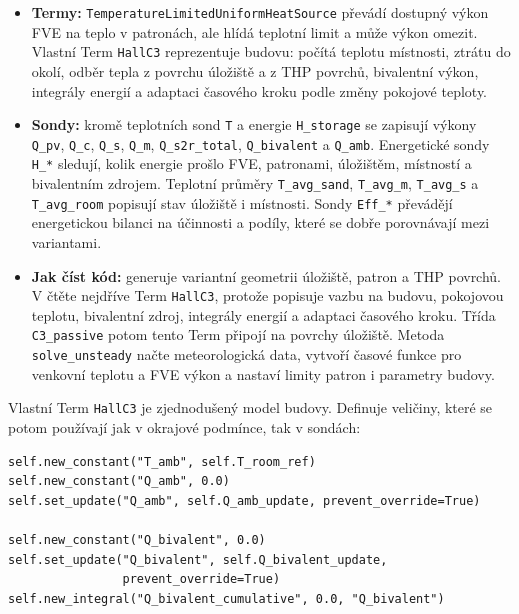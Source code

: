 \documentclass[a4paper,11pt]{article}
\begin{document}
\begin{itemize}
  \item \textbf{Termy:} \texttt{TemperatureLimitedUniformHeatSource} převádí
        dostupný výkon FVE na teplo v patronách, ale hlídá teplotní limit a
        může výkon omezit. Vlastní Term \texttt{HallC3} reprezentuje budovu:
        počítá teplotu místnosti, ztrátu do okolí, odběr tepla z povrchu
        úložiště a z THP povrchů, bivalentní výkon, integrály energií a adaptaci
        časového kroku podle změny pokojové teploty.
  \item \textbf{Sondy:} kromě teplotních sond \texttt{T} a energie
        \texttt{H\_storage} se zapisují výkony \texttt{Q\_pv}, \texttt{Q\_c},
        \texttt{Q\_s}, \texttt{Q\_m}, \texttt{Q\_s2r\_total},
        \texttt{Q\_bivalent} a \texttt{Q\_amb}. Energetické sondy
        \texttt{H\_*} sledují, kolik energie prošlo FVE, patronami, úložištěm,
        místností a bivalentním zdrojem. Teplotní průměry
        \texttt{T\_avg\_sand}, \texttt{T\_avg\_m}, \texttt{T\_avg\_s} a
        \texttt{T\_avg\_room} popisují stav úložiště i místnosti. Sondy
        \texttt{Eff\_*} převádějí energetickou bilanci na účinnosti a podíly,
        které se dobře porovnávají mezi variantami.
  \item \textbf{Jak číst kód:}  generuje variantní
        geometrii úložiště, patron a THP povrchů. V  čtěte
        nejdříve Term \texttt{HallC3}, protože popisuje vazbu na budovu,
        pokojovou teplotu, bivalentní zdroj, integrály energií a adaptaci
        časového kroku. Třída \texttt{C3\_passive} potom tento Term připojí na
        povrchy úložiště. Metoda \texttt{solve\_unsteady} načte meteorologická
        data, vytvoří časové funkce pro venkovní teplotu a FVE výkon a nastaví
        limity patron i parametry budovy.
\end{itemize}

Vlastní Term \texttt{HallC3} je zjednodušený model budovy. Definuje veličiny,
které se potom používají jak v okrajové podmínce, tak v sondách:

\begin{lstlisting}[style=py]
self.new_constant("T_amb", self.T_room_ref)
self.new_constant("Q_amb", 0.0)
self.set_update("Q_amb", self.Q_amb_update, prevent_override=True)

self.new_constant("Q_bivalent", 0.0)
self.set_update("Q_bivalent", self.Q_bivalent_update,
                prevent_override=True)
self.new_integral("Q_bivalent_cumulative", 0.0, "Q_bivalent")
\end{lstlisting}
\end{document}
